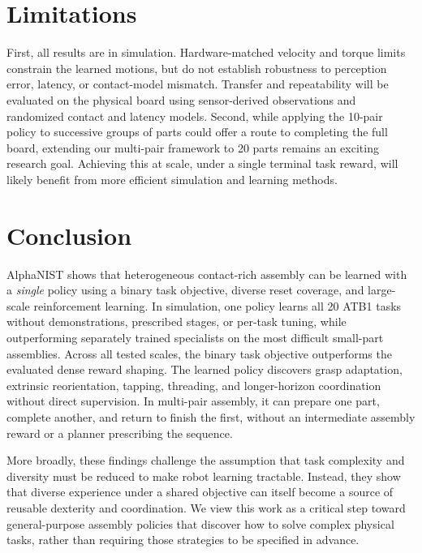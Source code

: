 \FloatBarrier
\section{Limitations}
\label{sec:limitations}
First, all results are in simulation. Hardware-matched velocity and torque
limits constrain the learned motions, but do not establish robustness to
perception error, latency, or contact-model mismatch. 
Transfer and repeatability
will be evaluated on the physical board using sensor-derived observations and
randomized contact and latency models.
Second, while applying the 10-pair policy to successive groups of parts could offer a route to completing the full board, extending our multi-pair framework to 20 parts remains an exciting research goal. Achieving this at scale, under a single terminal task reward, will likely benefit from more efficient simulation and learning methods.

\section{Conclusion}
\label{sec:conclusion}
AlphaNIST shows that heterogeneous contact-rich assembly can be learned with a \emph{single} policy using a binary task objective, diverse reset coverage, and large-scale reinforcement learning.
In simulation, one policy learns all
20 ATB1 tasks without demonstrations, prescribed stages, or per-task tuning, while outperforming separately trained specialists on the most difficult small-part assemblies.
Across all tested scales, the binary task objective outperforms the evaluated dense reward shaping.
The learned policy discovers grasp adaptation, extrinsic reorientation, tapping, threading, and longer-horizon coordination without direct supervision.
In multi-pair assembly, it can prepare one part, complete another, and return to finish the first, without an intermediate assembly reward or a planner prescribing the sequence.

More broadly, these findings challenge the assumption that task complexity and diversity must be reduced to make robot learning tractable. Instead, they show that diverse experience under a shared objective can itself become a source of reusable dexterity and coordination. We view this work as a critical step toward general-purpose assembly policies that discover how to solve complex physical tasks, rather than requiring those strategies to be specified in advance.
